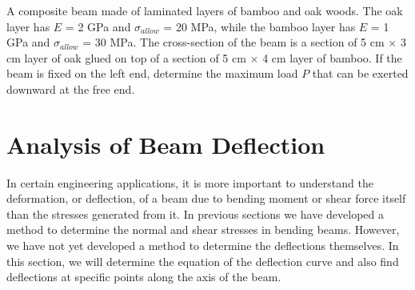 \documentclass[
10pt,
a4paper,
openany,
svgnames,
]{book} %
\begin{document}
\begin{exercises}
\item A composite beam made of laminated layers of bamboo and oak woods. The oak layer has $E$ = 2 GPa and $\sigma_{allow}$ = 20 MPa, while the bamboo layer has $E$ = 1 GPa and $\sigma_{allow}$ = 30 MPa. The cross-section of the beam is a section of 5 cm $\times$ 3 cm layer of oak glued on top of a section of 5 cm $\times$ 4 cm layer of bamboo. If the beam is fixed on the left end, determine the maximum load $P$ that can be exerted downward at the free end.

  \begin{figure}[h]
    \centering
  \end{figure}
  
\end{exercises}


\chapter{Analysis of Beam Deflection}

In certain engineering applications, it is more important to understand the deformation, or deflection, of a beam due to bending moment or shear force itself than the stresses generated from it. In previous sections we have developed a method to determine the normal and shear stresses in bending beams. However, we have not yet developed a method to determine the deflections themselves. In this section, we will determine the equation of the deflection curve and also find deflections at specific points along the axis of the beam.
\end{document}
